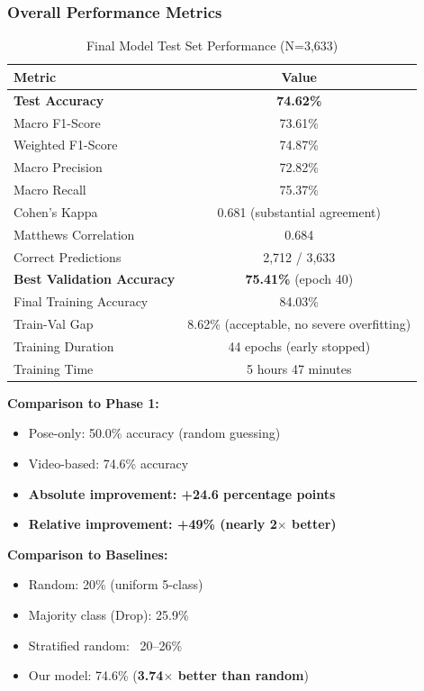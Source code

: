 \documentclass[11pt,a4paper]{article}
\begin{document}
\subsubsection{Overall Performance Metrics}

\begin{table}[H]
\centering
\caption{Final Model Test Set Performance (N=3,633)}
\begin{tabular}{lc}
\toprule
Metric & Value \\
\midrule
\textbf{Test Accuracy} & \textbf{74.62\%} \\
Macro F1-Score & 73.61\% \\
Weighted F1-Score & 74.87\% \\
Macro Precision & 72.82\% \\
Macro Recall & 75.37\% \\
Cohen's Kappa & 0.681 (substantial agreement) \\
Matthews Correlation & 0.684 \\
\midrule
Correct Predictions & 2,712 / 3,633 \\
\midrule
\textbf{Best Validation Accuracy} & \textbf{75.41\%} (epoch 40) \\
Final Training Accuracy & 84.03\% \\
Train-Val Gap & 8.62\% (acceptable, no severe overfitting) \\
\midrule
Training Duration & 44 epochs (early stopped) \\
Training Time & 5 hours 47 minutes \\
\bottomrule
\end{tabular}
\end{table}

\textbf{Comparison to Phase 1:}
\begin{itemize}
\item Pose-only: 50.0\% accuracy (random guessing)
\item Video-based: 74.6\% accuracy
\item \textbf{Absolute improvement: +24.6 percentage points}
\item \textbf{Relative improvement: +49\% (nearly 2$\times$ better)}
\end{itemize}

\textbf{Comparison to Baselines:}
\begin{itemize}
\item Random: 20\% (uniform 5-class)
\item Majority class (Drop): 25.9\%
\item Stratified random: ~20--26\%
\item Our model: 74.6\% (\textbf{3.74$\times$ better than random})
\end{itemize}
\end{document}
